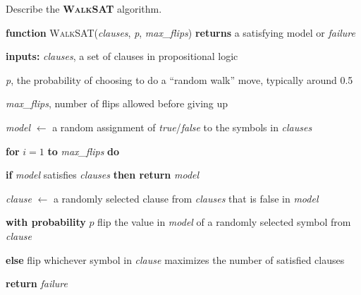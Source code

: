 \begin{flashcard}[Question]{Describe the \textbf{\textsc{WalkSAT}} algorithm.}
\footnotesize
\begin{center}
\begin{minipage}{\textwidth}
\textbf{function} \textsc{WalkSAT}(\textit{clauses}, \textit{p}, \textit{max\_flips}) \textbf{returns} a satisfying model or \textit{failure}

\quad \textbf{inputs:} \textit{clauses}, a set of clauses in propositional logic

\quad \quad \quad \quad \quad \textit{p}, the probability of choosing to do a ``random walk'' move, typically around 0.5

\quad \quad \quad \quad \quad \textit{max\_flips}, number of flips allowed before giving up

\medskip

\quad \textit{model} $\leftarrow$ a random assignment of \textit{true}/\textit{false} to the symbols in \textit{clauses}

\quad \textbf{for} $i=1$ \textbf{to} \textit{max\_flips} \textbf{do}

\quad \quad \textbf{if} \textit{model} satisfies \textit{clauses} \textbf{then return} \textit{model}

\quad \quad \textit{clause} $\leftarrow$ a randomly selected clause from \textit{clauses} that is false in \textit{model}

\quad \quad \textbf{with probability} $p$ flip the value in \textit{model} of a randomly selected symbol from \textit{clause}

\quad \quad \textbf{else} flip whichever symbol in \textit{clause} maximizes the number of satisfied clauses

\quad \textbf{return} \textit{failure}
\end{minipage}
\end{center}
\end{flashcard}
